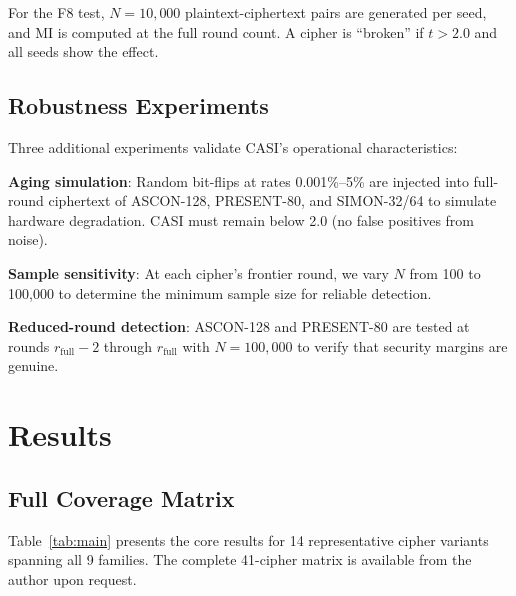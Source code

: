 \documentclass[conference]{IEEEtran}
\begin{document}
For the F8 test, $N = 10{,}000$ plaintext-ciphertext pairs are generated per seed, and MI is computed at the full round count.
A cipher is ``broken'' if $t > 2.0$ and all seeds show the effect.

\subsection{Robustness Experiments}

Three additional experiments validate CASI's operational characteristics:

\textbf{Aging simulation}: Random bit-flips at rates 0.001\%--5\% are injected into full-round ciphertext of ASCON-128, PRESENT-80, and SIMON-32/64 to simulate hardware degradation.
CASI must remain below 2.0 (no false positives from noise).

\textbf{Sample sensitivity}: At each cipher's frontier round, we vary $N$ from 100 to 100{,}000 to determine the minimum sample size for reliable detection.

\textbf{Reduced-round detection}: ASCON-128 and PRESENT-80 are tested at rounds $r_{\text{full}} - 2$ through $r_{\text{full}}$ with $N = 100{,}000$ to verify that security margins are genuine.


\section{Results}
\label{sec:results}

\subsection{Full Coverage Matrix}

Table~\ref{tab:main} presents the core results for 14 representative cipher variants spanning all 9 families.
The complete 41-cipher matrix is available from the author upon request.
\end{document}
